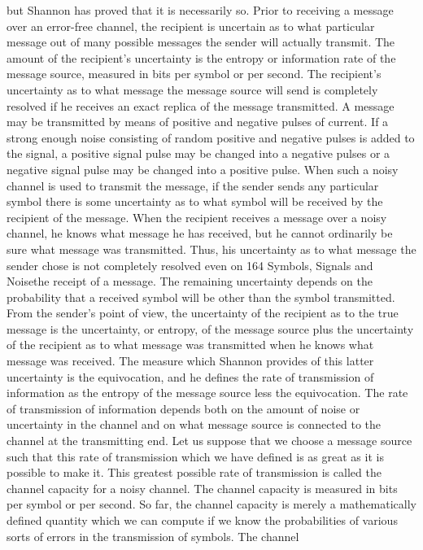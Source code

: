 {{{{{{{{{{but Shannon has proved that it is necessarily so.
Prior to receiving a message over an error-free channel, the
recipient is uncertain as to what particular message out of many
possible messages the sender will actually transmit. The amount
of the recipient’s uncertainty is the entropy or information rate of
the message source, measured in bits per symbol or per second.
The recipient’s uncertainty as to what message the message source
will send is completely resolved if he receives an exact replica of
the message transmitted.
A message may be transmitted by means of positive and negative
pulses of current. If a strong enough noise consisting of random
positive and negative pulses is added to the signal, a positive
signal pulse may be changed into a negative pulses or a negative
signal pulse may be changed into a positive pulse. When such a
noisy channel is used to transmit the message, if the sender sends
any particular symbol there is some uncertainty as to what symbol
will be received by the recipient of the message.
When the recipient receives a message over a noisy channel, he
knows what message he has received, but he cannot ordinarily be
sure what message was transmitted. Thus, his uncertainty as to
what message the sender chose is not completely resolved even on
164
Symbols, Signals and Noisethe receipt of a message. The remaining uncertainty depends on
the probability that a received symbol will be other than the
symbol transmitted.
From the sender’s point of view, the uncertainty of the recipient
as to the true message is the uncertainty, or entropy, of the message
source plus the uncertainty of the recipient as to what message was
transmitted when he knows what message was received. The measure
which Shannon provides of this latter uncertainty is the equivocation,
and he defines the rate of transmission of information as the
entropy of the message source less the equivocation.
The rate of transmission of information depends both on the
amount of noise or uncertainty in the channel and on what message
source is connected to the channel at the transmitting end. Let us
suppose that we choose a message source such that this rate of
transmission which we have defined is as great as it is possible to
make it. This greatest possible rate of transmission is called the
channel capacity for a noisy channel. The channel capacity is
measured in bits per symbol or per second.
So far, the channel capacity is merely a mathematically defined
quantity which we can compute if we know the probabilities of
various sorts of errors in the transmission of symbols. The channel
}}}}}}}}}}
